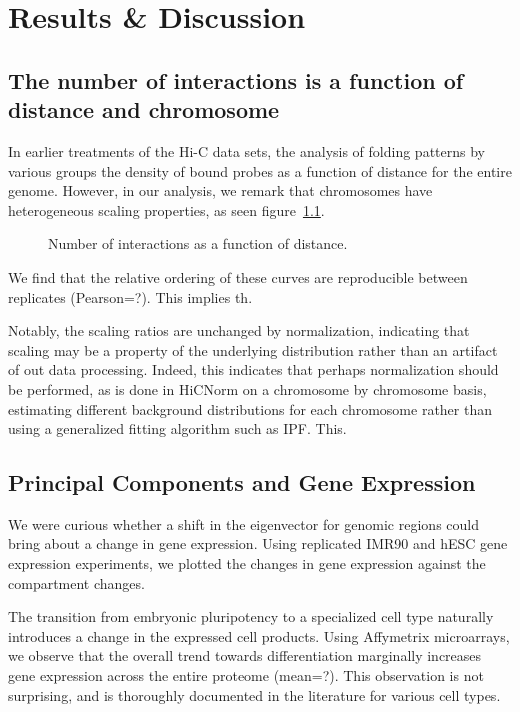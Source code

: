 
\chapter{Results \& Discussion}

\section*{The number of interactions is a function of distance and chromosome}
In earlier treatments of the Hi-C data sets, the analysis of folding patterns by various groups \citep{imakaev2012} \citep{dixon2012}
the density of bound probes as a function of distance for the entire genome.  However, in our analysis, we remark that chromosomes
have heterogeneous scaling properties, as seen figure~\ref{fig:interactionScaling}.

\begin{figure}[h]
  \caption{Number of interactions as a function of distance.}\label{fig:interactionScaling}
\end{figure}

We find that the relative ordering of these curves are reproducible between replicates (Pearson=?).  This implies th.

Notably, the scaling ratios are unchanged by normalization, indicating that scaling may be a property of the underlying distribution
rather than an artifact of out data processing.  Indeed, this indicates that perhaps normalization should be performed, as is
done in HiCNorm \citep{hu2012} on a chromosome by chromosome basis, estimating different background distributions for each chromosome
rather than using a generalized fitting algorithm such as IPF\@.  This.

\section*{Principal Components and Gene Expression}

We were curious whether a shift in the eigenvector for genomic regions could bring about a change in gene expression.  Using replicated
IMR90 and hESC gene expression experiments, we plotted the changes in gene expression against the compartment changes.


The transition from embryonic pluripotency to a specialized cell type naturally introduces a change in the expressed cell products.
Using Affymetrix microarrays, we observe that the overall trend towards differentiation marginally increases gene expression across
the entire proteome (mean=?).  This observation is not surprising, and is thoroughly documented in the literature \citep{tuomela2012}
for various cell types.

